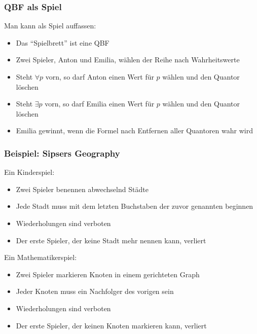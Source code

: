 \documentclass[aspectratio=1610,onlymath]{beamer}
\begin{document}
\begin{frame}\frametitle{QBF als Spiel}

Man kann  als Spiel auffassen:
\begin{itemize}
\item Das "`Spielbrett"' ist eine QBF
\item Zwei Spieler, \alert{Anton} und \alert{Emilia}, wählen der Reihe nach Wahrheitswerte
\item Steht $\forall p$ vorn, so darf Anton einen Wert für $p$ wählen und den Quantor löschen
\item Steht $\exists p$ vorn, so darf Emilia einen Wert für $p$ wählen und den Quantor löschen
\item Emilia gewinnt, wenn die Formel nach Entfernen aller Quantoren wahr wird
\end{itemize}\bigskip\pause


\end{frame}

\begin{frame}\frametitle{Beispiel: Sipsers Geography}

\alert{Ein Kinderspiel:}
\begin{itemize}
\item Zwei Spieler benennen abwechselnd Städte
\item Jede Stadt muss mit dem letzten Buchstaben der zuvor genannten beginnen
\item Wiederholungen sind verboten
\item Der erste Spieler, der keine Stadt mehr nennen kann, verliert
\end{itemize}
\smallskip

\pause
\alert{Ein Mathematikerspiel:}
\begin{itemize}
\item Zwei Spieler markieren Knoten in einem gerichteten Graph
\item Jeder Knoten muss ein Nachfolger des vorigen sein
\item Wiederholungen sind verboten
\item Der erste Spieler, der keinen Knoten markieren kann, verliert
\end{itemize}
\smallskip\pause

{}

\end{frame}
\end{document}
